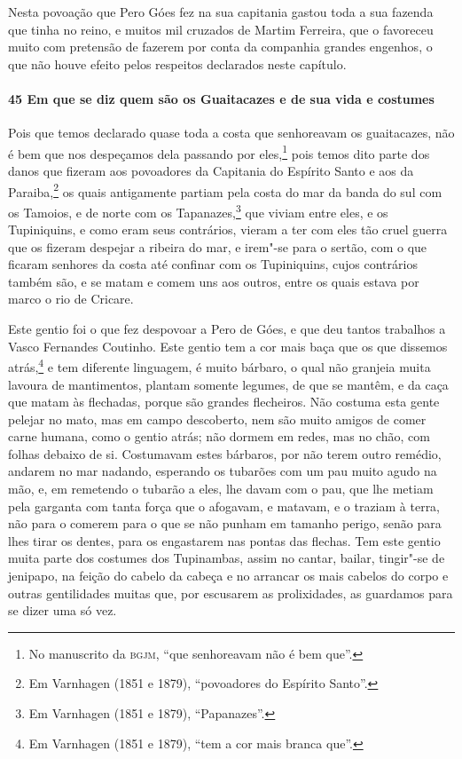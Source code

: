 Nesta povoação que Pero Góes fez na sua capitania gastou toda a sua fazenda que tinha no
reino, e muitos mil cruzados de Martim Ferreira, que o favoreceu muito com pretensão de
fazerem por conta da companhia grandes engenhos, o que não houve efeito pelos respeitos
declarados neste capítulo.

\paragraph{45 Em que se diz quem são os Guaitacazes e de sua vida e costumes}

Pois que temos declarado quase toda a costa que senhoreavam os guaitacazes, não é bem que
nos despeçamos dela passando por eles,\footnote{ No manuscrito da \textsc{bgjm}, ``que
senhoreavam não é bem que''.} pois temos dito parte dos danos que fizeram aos povoadores
da Capitania do Espírito Santo e aos da Paraiba,\footnote{ Em Varnhagen (1851 e 1879),
``povoadores do Espírito Santo''.} os quais antigamente partiam pela costa do mar da banda
do sul com os Tamoios, e de norte com os Tapanazes,\footnote{ Em Varnhagen (1851 e 1879),
``Papanazes''.} que viviam entre eles, e os Tupiniquins, e como eram seus contrários,
vieram a ter com eles tão cruel guerra que os fizeram despejar a ribeira do mar, e irem"-se
para o sertão, com o que ficaram senhores da costa até confinar com os Tupiniquins, cujos
contrários também são, e se matam e comem uns aos outros, entre os quais estava por marco
o rio de Cricare.

Este gentio foi o que fez despovoar a Pero de Góes, e que deu tantos trabalhos a Vasco
Fernandes Coutinho. Este gentio tem a cor mais baça que os que dissemos atrás,\footnote{
Em Varnhagen (1851 e 1879), ``tem a cor mais branca que''.} e tem diferente linguagem, é
muito bárbaro, o qual não granjeia muita lavoura de mantimentos, plantam somente legumes,
de que se mantêm, e da caça que matam às flechadas, porque são grandes flecheiros. Não
costuma esta gente pelejar no mato, mas em campo descoberto, nem são muito amigos de comer
carne humana, como o gentio atrás; não dormem em redes, mas no chão, com folhas debaixo de
si. Costumavam estes bárbaros, por não terem outro remédio, andarem no mar nadando,
esperando os tubarões com um pau muito agudo na mão, e, em remetendo o tubarão a eles, lhe
davam com o pau, que lhe metiam pela garganta com tanta força que o afogavam, e matavam, e
o traziam à terra, não para o comerem para o que se não punham em tamanho perigo, senão
para lhes tirar os dentes, para os engastarem nas pontas das flechas. Tem este gentio
muita parte dos costumes dos Tupinambas, assim no cantar, bailar, tingir"-se de jenipapo,
na feição do cabelo da cabeça e no arrancar os mais cabelos do corpo e outras gentilidades
muitas que, por escusarem as prolixidades, as guardamos para se dizer uma só vez.

